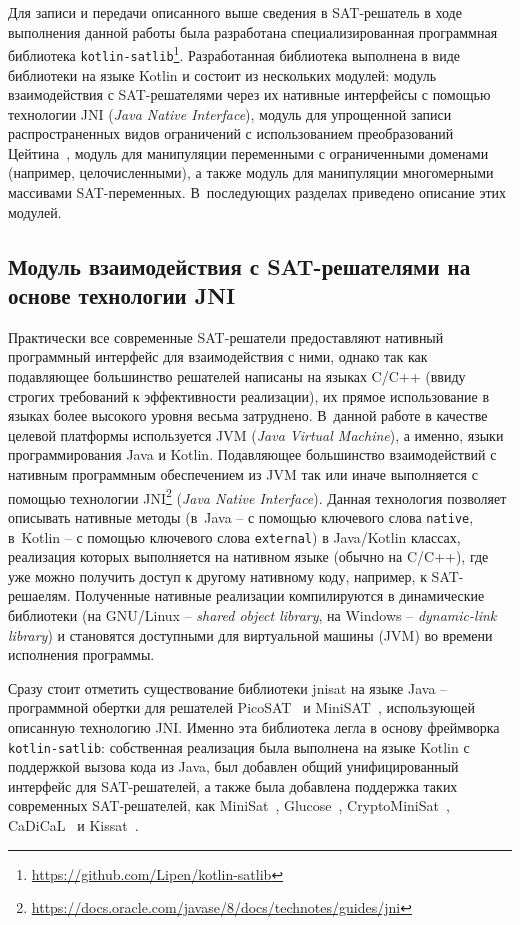 Для записи и передачи описанного выше сведения в SAT-решатель в ходе выполнения данной работы была разработана специализированная программная библиотека \texttt{kotlin-satlib}\footnote{\url{https://github.com/Lipen/kotlin-satlib}}.
Разработанная библиотека выполнена в виде библиотеки на языке Kotlin и состоит из нескольких модулей: модуль взаимодействия с SAT-решателями через их нативные интерфейсы с помощью технологии JNI (\textit{Java Native Interface}), модуль для упрощенной записи распространенных видов ограничений с использованием преобразований Цейтина~\cite{tseitin1970}, модуль для манипуляции переменными с ограниченными доменами (например, целочисленными), а также модуль для манипуляции многомерными массивами SAT-переменных.
В~последующих разделах приведено описание этих модулей.

\subsection{Модуль взаимодействия с SAT-решателями на основе технологии JNI}

Практически все современные SAT-решатели предоставляют нативный программный интерфейс для взаимодействия с ними, однако так как подавляющее большинство решателей написаны на языках C/C++ (ввиду строгих требований к эффективности реализации), их прямое использование в языках более высокого уровня весьма затруднено.
В~данной работе в качестве целевой платформы используется JVM (\textit{Java Virtual Machine}), а именно, языки программирования Java и Kotlin.
Подавляющее большинство взаимодействий с нативным программным обеспечением из JVM так или иначе выполняется с помощью технологии JNI\footnote{\href{https://docs.oracle.com/javase/8/docs/technotes/guides/jni/}{https://docs.oracle.com/javase/8/docs/technotes/guides/jni}} (\textit{Java Native Interface}).
Данная технология позволяет описывать нативные методы (в~Java \--- с помощью ключевого слова \texttt{native}, в~Kotlin \--- с помощью ключевого слова \texttt{external}) в Java/Kotlin классах, реализация которых выполняется на нативном языке (обычно на C/C++), где уже можно получить доступ к другому нативному коду, например, к SAT-решаелям.
Полученные нативные реализации компилируются в динамические библиотеки (на GNU/Linux \--- \textit{shared object library}, на Windows \--- \textit{dynamic-link library}) и становятся доступными для виртуальной машины (JVM) во времени исполнения программы.

Сразу стоит отметить существование библиотеки jnisat на языке Java \--- программной обертки для решателей PicoSAT~\cite{biere2008} и MiniSAT~\cite{minisat}, использующей описанную технологию JNI.
Именно эта библиотека легла в основу фреймворка \texttt{kotlin-satlib}: собственная реализация была выполнена на языке Kotlin с поддержкой вызова кода из Java, был добавлен общий унифицированный интерфейс для SAT-решателей, а также была добавлена поддержка таких современных SAT-решателей, как MiniSat~\cite{minisat}, Glucose~\cite{glucose}, CryptoMiniSat~\cite{cryptominisat}, CaDiCaL~\cite{cadical} и Kissat~\cite{kissat}.

